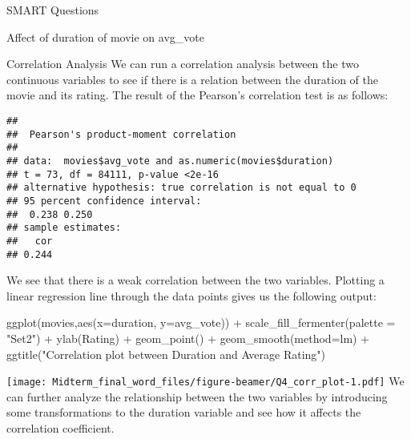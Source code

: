 \documentclass[
  ignorenonframetext,
]{beamer}
\newenvironment{Shaded}{\begin{snugshade}}{\end{snugshade}}
\newcommand{\AttributeTok}[1]{\textcolor[rgb]{0.77,0.63,0.00}{#1}}
\newcommand{\CommentTok}[1]{\textcolor[rgb]{0.56,0.35,0.01}{\textit{#1}}}
\newcommand{\FunctionTok}[1]{\textcolor[rgb]{0.00,0.00,0.00}{#1}}
\newcommand{\NormalTok}[1]{#1}
\newcommand{\SpecialCharTok}[1]{\textcolor[rgb]{0.00,0.00,0.00}{#1}}
\newcommand{\StringTok}[1]{\textcolor[rgb]{0.31,0.60,0.02}{#1}}
\begin{document}
\begin{frame}[fragile]{SMART Questions}
\begin{block}{Affect of duration of movie on avg\_vote}
\begin{block}{Correlation Analysis}
\protect\hypertarget{correlation-analysis}{}
We can run a correlation analysis between the two continuous variables
to see if there is a relation between the duration of the movie and its
rating. The result of the Pearson's correlation test is as follows:

\begin{Shaded}
\end{Shaded}

\begin{verbatim}
## 
##  Pearson's product-moment correlation
## 
## data:  movies$avg_vote and as.numeric(movies$duration)
## t = 73, df = 84111, p-value <2e-16
## alternative hypothesis: true correlation is not equal to 0
## 95 percent confidence interval:
##  0.238 0.250
## sample estimates:
##   cor 
## 0.244
\end{verbatim}

We see that there is a weak correlation between the two variables.
Plotting a linear regression line through the data points gives us the
following output:

\begin{Shaded}
\begin{Highlighting}[]
\FunctionTok{ggplot}\NormalTok{(movies,}\FunctionTok{aes}\NormalTok{(}\AttributeTok{x=}\NormalTok{duration, }\AttributeTok{y=}\NormalTok{avg\_vote)) }\SpecialCharTok{+} 
  \FunctionTok{scale\_fill\_fermenter}\NormalTok{(}\AttributeTok{palette =} \StringTok{"Set2"}\NormalTok{) }\SpecialCharTok{+}
    \FunctionTok{ylab}\NormalTok{(}\StringTok{\textquotesingle{}Rating\textquotesingle{}}\NormalTok{) }\SpecialCharTok{+}
      \FunctionTok{geom\_point}\NormalTok{() }\SpecialCharTok{+}
        \FunctionTok{geom\_smooth}\NormalTok{(}\AttributeTok{method=}\StringTok{\textquotesingle{}lm\textquotesingle{}}\NormalTok{) }\SpecialCharTok{+}
          \FunctionTok{ggtitle}\NormalTok{(}\StringTok{"Correlation plot between Duration and Average Rating"}\NormalTok{)}
\end{Highlighting}
\end{Shaded}

\texttt{[image: Midterm\_final\_word\_files/figure-beamer/Q4\_corr\_plot-1.pdf]}
We can further analyze the relationship between the two variables by
introducing some transformations to the duration variable and see how it
affects the correlation coefficient.
\end{block}
\end{block}


\end{frame}
\end{document}
